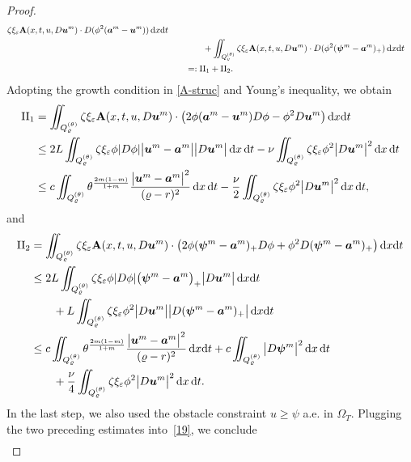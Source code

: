 \documentclass[a4paper, 10pt, american]{amsart}
\numberwithin{theorem}{section}
\numberwithin{equation}{section}
\newcommand{\A}[0]{\ensuremath{\mathbf{A}(x,t,u,D\power um)}}
\newcommand{\dxdt}{\,\mathrm{d}x\mathrm{d}t}
\newcommand{\dx}{\,\mathrm{d}x}
\newcommand{\dt}{\,\mathrm{d}t}
\renewcommand{\epsilon}{\varepsilon}
\renewcommand{\epsilon}{\varepsilon}
\renewcommand{\rho}{\varrho}
\newcommand{\power}[2]{\bm{#1^{\mbox{\unboldmath{\scriptsize$#2$}}}}}
\begin{document}
\begin{proof}
\begin{align}
\zeta\xi_\varepsilon \A \cdot D(\phi^2(\power am-\power um)) \dxdt  \\\nonumber
& \qquad\qquad +
\iint_{Q_\rho^{(\theta)}} \zeta\xi_\varepsilon \A \cdot
D(\phi^2(\power \psi m-\power am)_+) \dxdt\\\nonumber
&\qquad=:\mathrm{II}_1 + \mathrm{II}_2.
\end{align}
Adopting the growth condition in \eqref{A-struc} and Young's
inequality, we obtain 
\begin{align*}
	\mathrm{II}_1
	&= \iint_{Q_\rho^{(\theta)}} \zeta\xi_\epsilon \A \cdot \big(2
        \phi  (\power am-\power um)D\phi  - \phi^2 D\power um \big) \dxdt \\
	&\leq  
	2L\iint_{Q_\rho^{(\theta)}} 
	\zeta \xi_\varepsilon \phi  |D\phi| \big|\power u{m}-\power
        a{m}\big|\big|D\power u{m}\big|
	\dx\dt 
	-\nu\iint_{Q_\rho^{(\theta)}} 
	\zeta \xi_\varepsilon \phi^2  \big|D\power u{m}\big|^2
          \dx\dt
	\\
	&\leq   
	c \iint_{Q_\rho^{(\theta)}} \theta^{\frac{2m(1-m)}{1+m}}
        \frac{\big|\power u{m}-\power a{m}\big|^2}{(\rho-r)^2} \dx\dt -
	\frac{\nu}{2} \iint_{Q_\rho^{(\theta)}} 
	 \zeta \xi_\varepsilon  \phi^2 \big|D\power u{m}\big|^2 \dx\dt,
\end{align*}
and
\begin{align*}
\mathrm{II}_2 
&= \iint_{Q_\rho^{(\theta)}} \zeta\xi_\epsilon \A \cdot \big(2 \phi
(\power\psi m-\power am)_+  D\phi + \phi^2 D(\power \psi m-\power am)_+ \big) \dxdt \\
&\le	2L\iint_{Q_\rho^{(\theta)}} 
	\zeta \xi_\varepsilon \phi  |D\phi| \big(\power\psi{m}-\power
        a{m}\big)_+ \big|D\power u{m}\big|
	\dxdt \\
&\qquad	+ L \iint_{Q_\rho^{(\theta)}} 
	\zeta \xi_\varepsilon \phi^2  \big|D\power u{m}\big| \big|
        D(\power \psi m-\power am)_+\big|
          \dxdt \\
& \le c\iint_{Q_\rho^{(\theta)}} 
	   \theta^{\frac{2m(1-m)}{1+m}}\frac{ \big|\power u{m}-\power a{m}\big|^2}{(\rho-r)^2} \dxdt
	+ c \iint_{Q_\rho^{(\theta)}} \big|D\power \psi{m}\big|^2 \dx\dt \\
&\quad\quad	+\frac{\nu}{4} \iint_{Q_\rho^{(\theta)}} 
	 \zeta \xi_\varepsilon  \phi^2 \big|D\power u{m}\big|^2 \dx\dt.
\end{align*}
In the last step, we also used the obstacle constraint $u\ge\psi$
a.e. in $\Omega_T$.        
Plugging the two preceding estimates into~\eqref{19}, we conclude
\begin{align}\label{est-A}

\end{align}
\end{proof}
\end{document}
